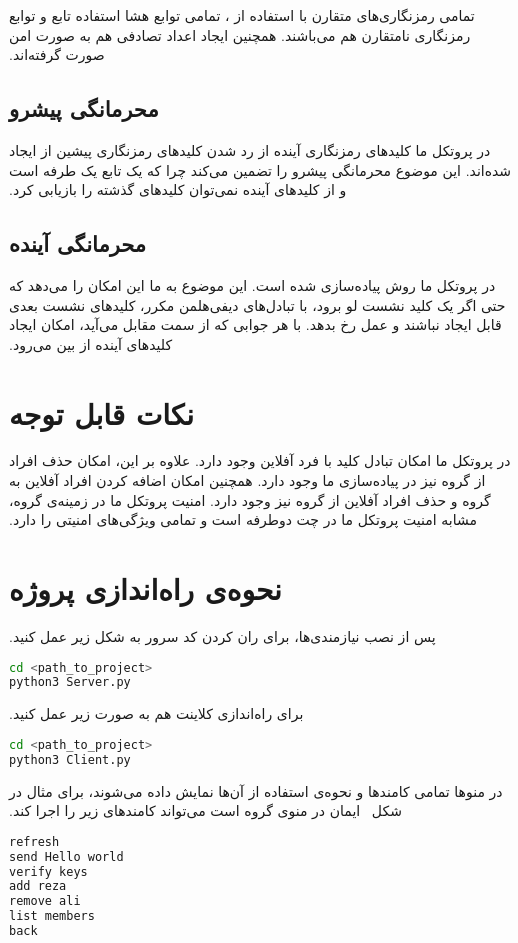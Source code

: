 ‫تمامی رمزنگاری‌های متقارن با استفاده از ، تمامی توابع هشا استفاده تابع  و توابع رمزنگاری نامتقارن هم  می‌باشند. همچنین ایجاد اعداد تصادفی هم به صورت امن صورت گرفته‌اند.
‫
‫\subsection{محرمانگی پیشرو}
‫در پروتکل ما کلیدهای رمزنگاری آینده از رد شدن کلیدهای رمزنگاری پیشین از  ایجاد شده‌اند. این موضوع محرمانگی پیشرو را تضمین می‌کند چرا که  یک تابع یک طرفه است و از کلیدهای آینده نمی‌توان کلید‌های گذشته را بازیابی کرد.
‫
‫\subsection{محرمانگی آینده}
‫در پروتکل ما روش  پیاده‌سازی شده است. این موضوع به ما این امکان را می‌دهد که حتی اگر یک کلید نشست لو برود، با تبادل‌های دیفی‌هلمن مکرر، کلید‌های نشست بعدی قابل ایجاد نباشند و عمل  رخ بدهد. با هر جوابی که از سمت مقابل می‌آید، امکان ایجاد کلیدهای آینده از بین می‌رود.
‫
‫
‫\section{نکات قابل توجه}
‫در پروتکل ما امکان تبادل کلید با فرد آفلاین وجود دارد. علاوه بر این، امکان حذف افراد از گروه نیز در پیاده‌سازی ما وجود دارد. همچنین امکان اضافه کردن افراد آفلاین به گروه و حذف افراد آفلاین از گروه نیز وجود دارد. امنیت پروتکل ما در زمینه‌ی گروه، مشابه امنیت پروتکل ما در چت دوطرفه است و تمامی ویژگی‌های امنیتی را دارد. 
‫
‫
‫\section{نحوه‌ی راه‌اندازی پروژه}
‫پس از نصب نیاز‌مندی‌ها، برای ران کردن کد سرور به شکل زیر عمل کنید.
‫

\begin{latin}
\begin{lstlisting}[firstnumber=1, language=bash]
cd <path_to_project>
python3 Server.py
\end{lstlisting}
\end{latin}

‫برای راه‌اندازی کلاینت هم به صورت زیر عمل کنید.
‫
\begin{latin}
\begin{lstlisting}[firstnumber=1, language=bash]
cd <path_to_project>
python3 Client.py
\end{lstlisting}
\end{latin}
‫
‫در منوها تمامی کامندها و نحوه‌ی استفاده از آن‌ها نمایش داده می‌شوند، برای مثال در شکل~ ایمان در منوی گروه است می‌تواند کامندهای زیر را اجرا کند.
‫
\begin{latin}
\begin{lstlisting}[firstnumber=1, language=bash]
refresh
send Hello world
verify keys
add reza
remove ali
list members
back
\end{lstlisting}
\end{latin}

